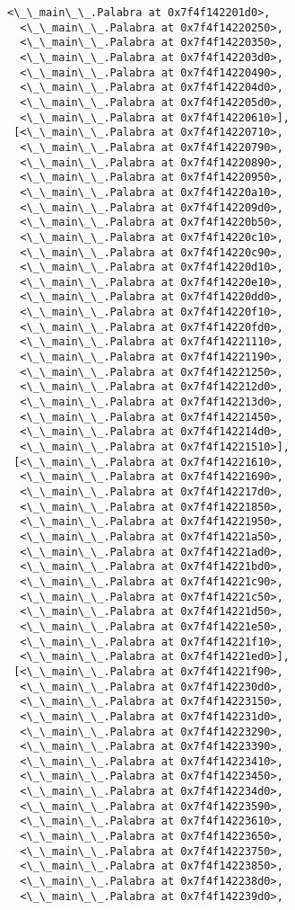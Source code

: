\documentclass[12pt,a4paper,table]{article}
\begin{document}
\begin{tcolorbox}[breakable, size=fbox, boxrule=.5pt, pad at break*=1mm, opacityfill=0]
\begin{Verbatim}[commandchars=\\\{\}]
  <\_\_main\_\_.Palabra at 0x7f4f142201d0>,
  <\_\_main\_\_.Palabra at 0x7f4f14220250>,
  <\_\_main\_\_.Palabra at 0x7f4f14220350>,
  <\_\_main\_\_.Palabra at 0x7f4f142203d0>,
  <\_\_main\_\_.Palabra at 0x7f4f14220490>,
  <\_\_main\_\_.Palabra at 0x7f4f142204d0>,
  <\_\_main\_\_.Palabra at 0x7f4f142205d0>,
  <\_\_main\_\_.Palabra at 0x7f4f14220610>],
 [<\_\_main\_\_.Palabra at 0x7f4f14220710>,
  <\_\_main\_\_.Palabra at 0x7f4f14220790>,
  <\_\_main\_\_.Palabra at 0x7f4f14220890>,
  <\_\_main\_\_.Palabra at 0x7f4f14220950>,
  <\_\_main\_\_.Palabra at 0x7f4f14220a10>,
  <\_\_main\_\_.Palabra at 0x7f4f142209d0>,
  <\_\_main\_\_.Palabra at 0x7f4f14220b50>,
  <\_\_main\_\_.Palabra at 0x7f4f14220c10>,
  <\_\_main\_\_.Palabra at 0x7f4f14220c90>,
  <\_\_main\_\_.Palabra at 0x7f4f14220d10>,
  <\_\_main\_\_.Palabra at 0x7f4f14220e10>,
  <\_\_main\_\_.Palabra at 0x7f4f14220dd0>,
  <\_\_main\_\_.Palabra at 0x7f4f14220f10>,
  <\_\_main\_\_.Palabra at 0x7f4f14220fd0>,
  <\_\_main\_\_.Palabra at 0x7f4f14221110>,
  <\_\_main\_\_.Palabra at 0x7f4f14221190>,
  <\_\_main\_\_.Palabra at 0x7f4f14221250>,
  <\_\_main\_\_.Palabra at 0x7f4f142212d0>,
  <\_\_main\_\_.Palabra at 0x7f4f142213d0>,
  <\_\_main\_\_.Palabra at 0x7f4f14221450>,
  <\_\_main\_\_.Palabra at 0x7f4f142214d0>,
  <\_\_main\_\_.Palabra at 0x7f4f14221510>],
 [<\_\_main\_\_.Palabra at 0x7f4f14221610>,
  <\_\_main\_\_.Palabra at 0x7f4f14221690>,
  <\_\_main\_\_.Palabra at 0x7f4f142217d0>,
  <\_\_main\_\_.Palabra at 0x7f4f14221850>,
  <\_\_main\_\_.Palabra at 0x7f4f14221950>,
  <\_\_main\_\_.Palabra at 0x7f4f14221a50>,
  <\_\_main\_\_.Palabra at 0x7f4f14221ad0>,
  <\_\_main\_\_.Palabra at 0x7f4f14221bd0>,
  <\_\_main\_\_.Palabra at 0x7f4f14221c90>,
  <\_\_main\_\_.Palabra at 0x7f4f14221c50>,
  <\_\_main\_\_.Palabra at 0x7f4f14221d50>,
  <\_\_main\_\_.Palabra at 0x7f4f14221e50>,
  <\_\_main\_\_.Palabra at 0x7f4f14221f10>,
  <\_\_main\_\_.Palabra at 0x7f4f14221ed0>],
 [<\_\_main\_\_.Palabra at 0x7f4f14221f90>,
  <\_\_main\_\_.Palabra at 0x7f4f142230d0>,
  <\_\_main\_\_.Palabra at 0x7f4f14223150>,
  <\_\_main\_\_.Palabra at 0x7f4f142231d0>,
  <\_\_main\_\_.Palabra at 0x7f4f14223290>,
  <\_\_main\_\_.Palabra at 0x7f4f14223390>,
  <\_\_main\_\_.Palabra at 0x7f4f14223410>,
  <\_\_main\_\_.Palabra at 0x7f4f14223450>,
  <\_\_main\_\_.Palabra at 0x7f4f142234d0>,
  <\_\_main\_\_.Palabra at 0x7f4f14223590>,
  <\_\_main\_\_.Palabra at 0x7f4f14223610>,
  <\_\_main\_\_.Palabra at 0x7f4f14223650>,
  <\_\_main\_\_.Palabra at 0x7f4f14223750>,
  <\_\_main\_\_.Palabra at 0x7f4f14223850>,
  <\_\_main\_\_.Palabra at 0x7f4f142238d0>,
  <\_\_main\_\_.Palabra at 0x7f4f142239d0>,

\end{Verbatim}
\end{tcolorbox}
\end{document}
